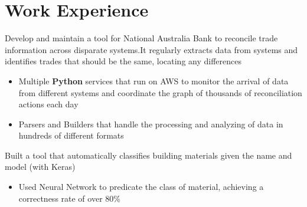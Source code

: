 \documentclass{resume}
\begin{document}
\section{Work Experience}
\begin{flushleft}
Develop and maintain a tool for National Australia Bank to reconcile trade information across disparate systems.\linebreak It regularly extracts data from systems and identifies trades that should be the same, locating any differences
\begin{itemize}
  \item Multiple \textbf{Python} services that run on AWS to monitor the arrival of data from different systems and \linebreak coordinate the graph of thousands of reconciliation actions each day
  \item Parsers and Builders that handle the processing and analyzing of data in hundreds of different formats
\end{itemize}
\end{flushleft}
\begin{flushleft}
Built a tool that automatically classifies building materials given the name and model (with Keras)
\begin{itemize}
  \item Used Neural Network to predicate the class of material, achieving a correctness rate of over 80\%
\end{itemize}
\end{flushleft}
\end{document}
